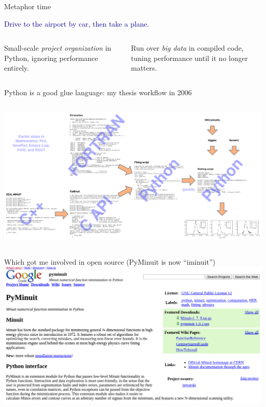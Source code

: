 \documentclass[aspectratio=169]{beamer}
\begin{document}
\begin{frame}{Metaphor time}
\Large
\vspace{0.25 cm}
\begin{center}
\textcolor{darkblue}{Drive to the airport by car, then take a plane.}
\end{center}

\vspace{0.5 cm}
\begin{columns}
\begin{center}
Small-scale {\it project organization} in Python, ignoring performance entirely.
\end{center}

\begin{center}
Run over {\it big data} in compiled code, tuning performance until it no longer matters.
\end{center}

\end{columns}
\end{frame}

\begin{frame}{Python is a good glue language: my thesis workflow in 2006}
\vspace{0.5 cm}
\begin{columns}
\includegraphics[width=\linewidth]{thesis-code-flow.pdf}
\end{columns}
\end{frame}

\begin{frame}{Which got me involved in open source (PyMinuit is now ``iminuit'')}
\vspace{0.5 cm}
\includegraphics[width=\linewidth]{pyminuit.png}
\end{frame}
\end{document}
